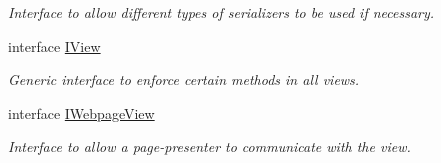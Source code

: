 \begin{DoxyCompactItemize}
\begin{DoxyCompactList}\small\item\em Interface to allow different types of serializers to be used if necessary. \item\end{DoxyCompactList}\item 
interface \hyperlink{interface_assessment___two___logic_1_1_interfaces_1_1_i_view}{IView}
\begin{DoxyCompactList}\small\item\em Generic interface to enforce certain methods in all views. \item\end{DoxyCompactList}\item 
interface \hyperlink{interface_assessment___two___logic_1_1_interfaces_1_1_i_webpage_view}{IWebpageView}
\begin{DoxyCompactList}\small\item\em Interface to allow a page-\/presenter to communicate with the view. \item\end{DoxyCompactList}\end{DoxyCompactItemize}
